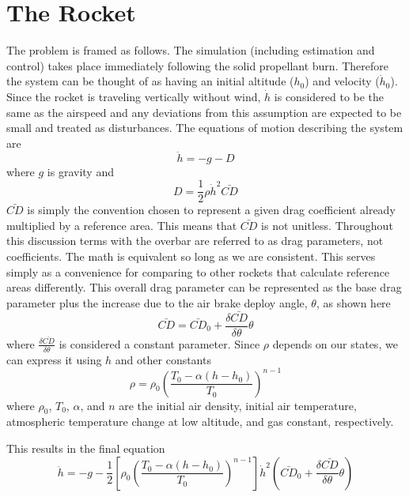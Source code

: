 \documentclass{article}
\begin{document}
\section{The Rocket}
  The problem is framed as follows. The simulation (including estimation and control) takes place immediately following the solid propellant burn. Therefore the system can be thought of as having an initial altitude ($h_0$) and velocity ($\dot{h}_0$). Since the rocket is traveling vertically without wind, $\dot{h}$ is considered to be the same as the airspeed and any deviations from this assumption are expected to be small and treated as disturbances. The equations of motion describing the system are
  \begin{equation}
    \ddot{h} = -g -D
  \end{equation}
  where $g$ is gravity and
  \begin{equation}
    D = \frac{1}{2} \rho \dot{h}^2 \bar{CD}
  \end{equation}
  $\bar{CD}$ is simply the convention chosen to represent a given drag coefficient already multiplied by a reference area. This means that $\bar{CD}$ is not unitless. Throughout this discussion terms with the overbar are referred to as drag parameters, not coefficients. The math is equivalent so long as we are consistent. This serves simply as a convenience for comparing to other rockets that calculate reference areas differently. This overall drag parameter can be represented as the base drag parameter plus the increase due to the air brake deploy angle, $\theta$, as shown here
  \begin{equation}
    \bar{CD} = \bar{CD}_0 + \frac{\delta\bar{CD}}{\delta\theta} \theta
  \end{equation}
  where $\frac{\delta\bar{CD}}{\delta\theta}$ is considered a constant parameter. Since $\rho$ depends on our states, we can express it using $h$ and other constants
  \begin{equation}
    \rho = \rho_0 \left(   \frac{T_0 - \alpha\left( h-h_0 \right)}{T_0}   \right)^{n-1}
  \end{equation}
  where $\rho_0$, $T_0$, $\alpha$, and $n$ are the initial air density, initial air temperature, atmospheric temperature change at low altitude, and gas constant, respectively.

  This results in the final equation
  \begin{equation}
    \ddot{h} = -g -\frac{1}{2} \left[\rho_0 \left(   \frac{T_0 - \alpha\left( h-h_0 \right)}{T_0}   \right)^{n-1}\right] \dot{h}^2 \left(\bar{CD}_0 + \frac{\delta\bar{CD}}{\delta\theta} \theta \right)
  \end{equation}
\end{document}
